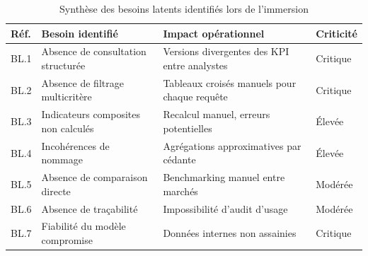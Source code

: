 \documentclass[../main.tex]{subfiles}
\begin{document}
\begin{table}[H]
\centering
\caption{Synthèse des besoins latents identifiés lors de l'immersion}
\label{tab:besoins_latents}
\small
\begin{tabularx}{\textwidth}{@{}p{1.1cm}p{3.8cm}Xp{2cm}@{}}
\toprule
\textbf{Réf.} & \textbf{Besoin identifié} & \textbf{Impact opérationnel} & \textbf{Criticité} \\
\midrule
BL.1 & Absence de consultation structurée & Versions divergentes des KPI entre analystes & Critique \\
BL.2 & Absence de filtrage multicritère & Tableaux croisés manuels pour chaque requête & Critique \\
BL.3 & Indicateurs composites non calculés & Recalcul manuel, erreurs potentielles & Élevée \\
BL.4 & Incohérences de nommage & Agrégations approximatives par cédante & Élevée \\
BL.5 & Absence de comparaison directe & Benchmarking manuel entre marchés & Modérée \\
BL.6 & Absence de traçabilité & Impossibilité d'audit d'usage & Modérée \\
BL.7 & Fiabilité du modèle compromise & Données internes non assainies & Critique \\
\bottomrule
\end{tabularx}
\end{table}
\end{document}
